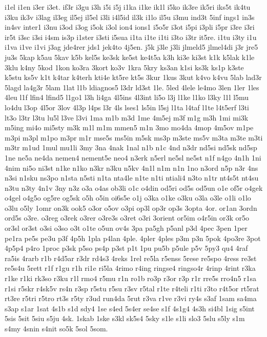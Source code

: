 {i1el
i1en
i3er
i3et.
if3r
i3gu
i3h
i5i
i5j
i1ka
i1ke
ik1l
i5ko
ik3re
ik5ri
iks5t
ik4tu
i3ku
ik3v
i3lag
il3eg
il5ej
il5el
i3li
i4l5id
il3k
i1lo
il5u
i3mu
ind3t
5inf
ings1
in3s
in4sv
inter1
i3nu
i3od
i3og
i5ok
i3ol
ion4
ions1
i5o5r
i3ot
i5pi
i3pli
i5pr
i3re
i3ri
ir5t
i3sc
i3si
i4sm
is3p
i1ster
i3sti
i5sua
i1ta
i1te
i1ti
i3to
i3tr
it5re.
i1tu
i3ty
i1u
i1va
i1ve
i1vi
j3ag
jde4rer
jds1
jek4to
4j5en.
j5k
j3le
j3li
jlmeld5
jlmel4di
j3r
jre5
ju3s
5kap
k5au
5kav
k5b
kel5s
ke3sk
ke5st
ke4t5a
k3h
ki3e
ki3st
k1k
k5lak
k1le
3klu
k4ny
5kod
1kon
ko3ra
3kort
ko3v
1kra
5kry
ks3an
k1si
ks3k
ks1p
k3ste
k5stu
ks5v
k1t
k4tar
k4terh
kti4e
kt5re
kt5s
3kur
1kus
3kut
k4vo
k4vu
5lab
lad3r
5lagd
la4g3r
5lam
1lat
l1b
ldiagnos5
l3dr
ld3st
1le.
5led
4lele
le4mo
3len
1ler
1les
4leu
l1f
lfin4
lfind5
l1go1
l3h
li4ga
4l5ins
4l3int
li5o
l3j
l1ke
l1ko
l3ky
l1l
l5mu
lo4du
l3op
4l5or
3lov
4l3p
l4ps
l3r
4ls
lses1
ls5in
l5sj
l1ta
l4taf
l1te
l4t5erf
l3ti
lt3o
l3tr
l3tu
lu5l
l3ve
l3vi
1ma
m1b
m3d
1me
4m5ej
m3f
m1g
m3h
1mi
mi3k
m5ing
mi4o
mi5sty
m3k
m1l
m1m
mmen5
m1n
3mo
mo4da
4mop
4m5ov
m1pe
m3pi
m3pl
m1po
m3pr
m1r
mse5s
ms5in
m5sk
ms3p
m3ste
ms5v
m3ta
m3te
m3ti
m3tr
m1ud
1mul
mu1li
3my
3na
4nak
1nal
n1b
n1c
4nd
n3dr
nd5si
nd5sk
nd5sp
1ne
ne5a
ne4da
nemen4
nement5e
neo4
n3erk
n5erl
ne5sl
ne5st
n1f
n4go
4n1h
1ni
4nim
ni5o
ni3st
n1ke
n1ko
n3kr
n3ku
n5kv
4n1l
n1m
n1n
1no
n3ord
n5p
n3r
4ns
n3si
n1sku
ns3po
n1sta
n5sti
n1ta
nta4le
n1te
n1ti
ntiali4
n3to
n1tr
nt4s5t
nt4su
n3tu
n3ty
4n1v
3ny
n3z
o3a
o4as
ob3li
o1c
o4din
od5ri
od5s
od5un
o1e
of5r
o4gek
o4gel
o4g5o
og5re
og5sk
o5h
o5in
oi6s5e
o1j
o3ka
o1ke
o3ku
o3la
o3le
o1li
o1lo
o3lu
o5ly
1omr
on3k
ook5
o3or
o5ov
o3pi
op3l
op3r
op3s
3opta
4or.
or1an
3ordn
ord5s
o3re.
o3reg
o3rek
o3rer
o3re3s
o3ret
o3ri
3orient
or5im
o4r5in
or3k
or5o
or3sl
or3st
o3si
o3so
o3t
o1te
o5un
ov4s
3pa
pa5gh
p5anl
p3d
4pec
3pen
1per
pe1ra
pe5s
pe3u
p3f
4p5h
1pla
p4lan
4ple.
4pler
4ples
p3m
p3n
5pok
4po3re
3pot
4p5p4
p4ro
1proc
p3sk
p5so
ps4p
p3st
p1t
1pu
pu5b
p5ule
p5v
5py3
qu4
4raf
ra5is
4rarb
r1b
r4d5ar
r3dr
rd4s3
4reks
1rel
re5la
r5enss
5rese
re5spo
4ress
re3st
re5s4u
5rett
r1f
r1gu
r1h
ri1e
ri5la
4rimo
r4ing
ringse4
ringso4r
4rinp
4rint
r3ka
r1ke
r1ki
rk3so
r3ku
r1l
rmo4
r5mu
r1n
ro1b
ro3p
r3or
r3p
r1r
rre5s
rro4n5
r1sa
r1si
r5skr
r4sk5v
rs4n
r3sp
r5stu
r5su
r3sv
r5tal
r1te
r4teli
r1ti
r3to
r4t5or
rt5rat
rt3re
r5tri
r5tro
rt3s
r5ty
r3ud
run4da
5rut
r3va
r1ve
r3vi
ry4s
s3af
1sam
sa4ma
s3ap
s1ar
1sat
4s1b
s1d
sdy4
1se
s4ed
5s4er
se4se
s1f
4s1g4
4s3h
si4bl
1sig
s5int
5sis
5sit
5siu
s5ju
4sk.
1skab
1ske
s3kl
sk5s4
5sky
s1le
s1li
slo3
5slu
s5ly
s1m
s4my
4snin
s4nit
so5k
5sol
5som.
}
